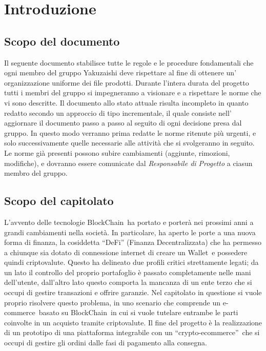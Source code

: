 \section{Introduzione}
\subsection {Scopo del documento}
Il seguente documento stabilisce tutte le regole e le procedure fondamentali che ogni membro del gruppo Yakuzaishi deve rispettare al fine di ottenere un' organizzazione uniforme dei file prodotti.
Durante l'intera durata del progetto tutti i membri del gruppo si impegneranno a visionare e a rispettare le norme che vi sono descritte.
Il documento allo stato attuale risulta incompleto in quanto redatto secondo un approccio di tipo incrementale, il quale consiste nell' aggiornare il documento passo a passo al seguito di ogni decisione presa dal gruppo.
In questo modo verranno prima redatte le norme ritenute più urgenti, e solo successivamente quelle necessarie alle attività che si svolgeranno in seguito.
Le norme già presenti possono subire cambiamenti (aggiunte, rimozioni, modifiche), e dovranno essere comunicate dal \textit{Responsabile di Progetto} a ciasun membro del gruppo.
\subsection{Scopo del capitolato}
L'avvento delle tecnologie BlockChain\glo\ ha portato e porterà nei prossimi anni a grandi cambiamenti nella società. 
In particolare, ha aperto le porte a una nuova forma di finanza, la cosiddetta “DeFi” (Finanza Decentralizzata) che ha permesso a chiunque sia dotato di connessione internet di creare un Wallet\glo\ e possedere quindi criptovalute\glo.
Questo ha delineato due profili critici strettamente legati; da un lato il controllo del proprio portafoglio è passato completamente nelle mani dell'utente, dall'altro lato questo comporta la mancanza di un ente terzo che si occupi di gestire transazioni e offrire garanzie.
\newline
Nel capitolato in questione si vuole proprio risolvere questo problema, in uno scenario che comprende un e-commerce\glo\ basato su BlockChain\glo\ in cui si vuole tutelare entrambe le parti coinvolte in un acquisto tramite criptovalute.
\newline
Il fine del progetto è la realizzazione di un prototipo di una piattaforma integrabile con un “crypto-ecommerce”\glo\, che si occupi di gestire gli ordini dalle fasi di pagamento alla consegna.
